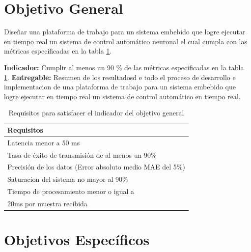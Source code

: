 \documentclass[12pt]{article}
\begin{document}
\section{Objetivo General}

Diseñar una plataforma de trabajo para un sistema embebido que logre ejecutar en tiempo real un sistema de control automático neuronal el cual cumpla con las métricas especificadas en la tabla \ref{tab:obj_1}.

\textbf{Indicador:} Cumplir al menos un 90 \% de las métricas especificadas en la tabla \ref{tab:obj_1}.\newline
\textbf{Entregable:} Resumen de los resultadosd e todo el proceso de desarrollo e implementacion de una plataforma de trabajo para un sistema embebido que logre ejecutar en tiempo real un sistema de control automático en tiempo real.


\begin{table}[!h]
  \centering
  \caption{Requisitos para satisfacer el indicador del objetivo general}
  \label{tab:obj_1}
  \begin{tabular}{|l|}
    \hline
    \rowcolor[HTML]{DAE8FC} 
    Requisitos \\ \hline
    Latencia menor a 50 ms\\ \hline
    Tasa de éxito de transmisión de al menos un 90\%\\ \hline
    Precisión de los datos (Error absoluto medio MAE del 5\%)\\ \hline
    Saturacion del sistema no mayor al 90\% \\ \hline
    Tiempo de procesamiento menor o igual a \\ 20ms por muestra recibida\\ \hline
    \end{tabular}
\end{table}

\section{Objetivos Específicos}
\end{document}
